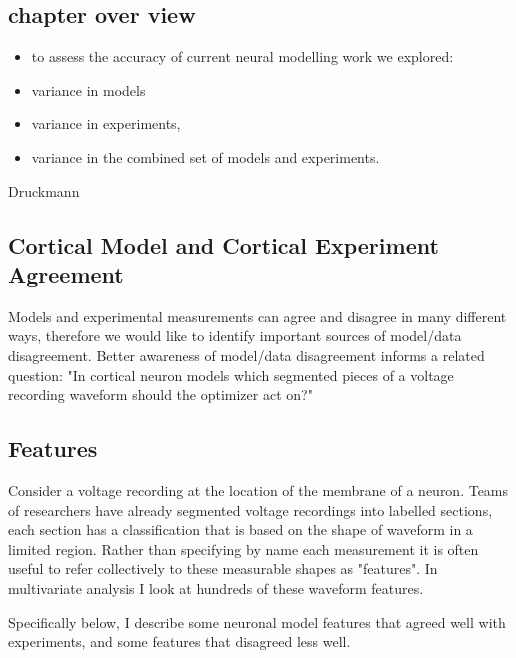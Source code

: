 
\subsection{chapter over view}
\begin{itemize}
\item to assess the accuracy of current neural modelling work we explored:
\item variance in models
\item variance in experiments,  
\item variance in the combined set of models and experiments.
\end{itemize}


Druckmann \cite{druckmann2008evaluating}

\subsection{Cortical Model and Cortical Experiment Agreement}
Models and experimental measurements can agree and disagree in many different ways, therefore we would like to identify important sources of model/data disagreement. Better awareness of model/data disagreement informs a related question: "In  cortical neuron models which segmented pieces of a voltage recording waveform should the optimizer act on?"

\subsection{Features} Consider a voltage recording at the location of the membrane of a neuron. Teams of researchers have already segmented voltage recordings into labelled sections, each section has a classification that is based on the shape of waveform in a limited region. Rather than specifying by name each measurement it is often useful to refer collectively to these measurable shapes as "features". In multivariate analysis I look at hundreds of these waveform features. 

Specifically below, I describe some neuronal model features that agreed well with experiments, and some features that disagreed less well.

